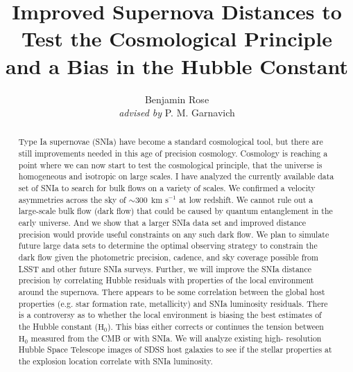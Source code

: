 \documentclass[apj, iop]{emulateapj}
\newcommand{\sn}{SNIa}
\newcommand{\Hubble}{\ensuremath{\text{H}_0}}
\newcommand{\kms}{\ensuremath{~\text{km s}^{-1}}}
\begin{document}
\title{Improved Supernova Distances to Test the Cosmological Principle \\and a Bias in the Hubble Constant}

\author{Benjamin Rose \\{\it advised by} P. M. Garnavich}



\begin{abstract} 

Type Ia supernovae (\sn{}) have become a standard cosmological tool, but there
are still improvements needed in this age of precision cosmology.  Cosmology  is
reaching a point where we can now start to test the cosmological principle, that
the universe is homogeneous and isotropic on large scales.  I have analyzed the
currently available data set of \sn{} to search for bulk flows on a variety of
scales. We confirmed a velocity asymmetries across the sky of $\sim 300~\kms{}$
at low redshift. We cannot rule out a large-scale bulk flow (dark flow) that
could be caused by quantum entanglement in the early universe. And we show that
a larger \sn{} data set and improved distance precision would provide useful
constraints on any such dark flow.  We plan to simulate future large data sets
to determine the optimal observing strategy to constrain the dark flow given the
photometric precision, cadence, and sky coverage possible from LSST and other
future \sn{} surveys.  Further, we will improve the \sn{} distance precision by
correlating Hubble residuals with properties of the local environment around the
supernova. There appears to be some correlation between the global host
properties (e.g. star formation rate, metallicity) and \sn{} luminosity
residuals. There is a controversy as to whether the local environment is biasing
the best estimates of the Hubble constant (\Hubble{}). This bias either corrects
or continues the tension between \Hubble{} measured from the CMB or with \sn{}.
We will analyze existing high- resolution Hubble Space Telescope images of SDSS
host galaxies to see if the stellar properties at the explosion location
correlate with \sn{} luminosity.

\end{abstract}
\end{document}
